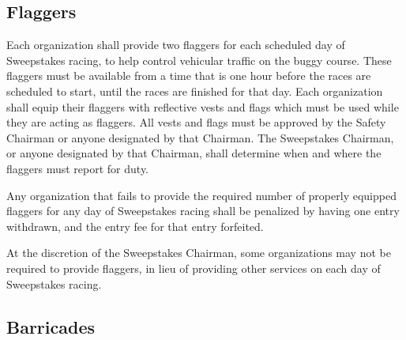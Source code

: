 \subsection{Flaggers}

Each organization shall provide two flaggers for each scheduled day of Sweepstakes racing, to help control vehicular traffic on the buggy course. These flaggers must be available from a time that is one hour before the races are scheduled to start, until the races are finished for that day. Each organization shall equip their flaggers with reflective vests and flags which must be used while they are acting as flaggers. All vests and flags must be approved by the Safety Chairman or anyone designated by that Chairman. The Sweepstakes Chairman, or anyone designated by that Chairman, shall determine when and where the flaggers must report for duty.

Any organization that fails to provide the required number of properly equipped flaggers for any day of Sweepstakes racing shall be penalized by having one entry withdrawn, and the entry fee for that entry forfeited.

At the discretion of the Sweepstakes Chairman, some organizations may not be required to provide flaggers, in lieu of providing other services on each day of Sweepstakes racing.

\subsection{Barricades}

